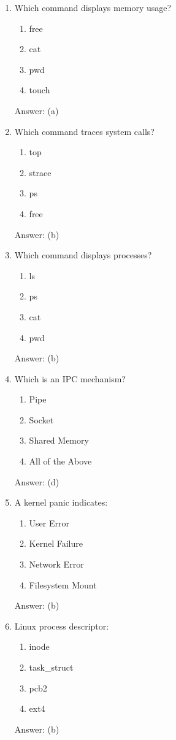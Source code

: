 \begin{enumerate}
\item Which command displays memory usage?
\begin{enumerate}[label=(\alph*)]
\item free
\item cat
\item pwd
\item touch
\end{enumerate}
Answer: (a)

\item Which command traces system calls?
\begin{enumerate}[label=(\alph*)]
\item top
\item strace
\item ps
\item free
\end{enumerate}
Answer: (b)

\item Which command displays processes?
\begin{enumerate}[label=(\alph*)]
\item ls
\item ps
\item cat
\item pwd
\end{enumerate}
Answer: (b)

\item Which is an IPC mechanism?
\begin{enumerate}[label=(\alph*)]
\item Pipe
\item Socket
\item Shared Memory
\item All of the Above
\end{enumerate}
Answer: (d)

\item A kernel panic indicates:
\begin{enumerate}[label=(\alph*)]
\item User Error
\item Kernel Failure
\item Network Error
\item Filesystem Mount
\end{enumerate}
Answer: (b)

\item Linux process descriptor:
\begin{enumerate}[label=(\alph*)]
\item inode
\item task\_struct
\item pcb2
\item ext4
\end{enumerate}
Answer: (b)


\end{enumerate}
